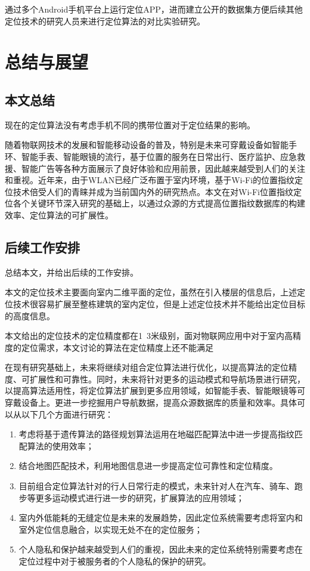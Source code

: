 通过多个Android手机平台上运行定位APP，进而建立公开的数据集方便后续其他定位技术的研究人员来进行定位算法的对比实验研究。




\chapter{总结与展望}

\section{本文总结}

现在的定位算法没有考虑手机不同的携带位置对于定位结果的影响。

随着物联网技术的发展和智能移动设备的普及，特别是未来可穿戴设备如智能手环、智能手表、智能眼镜的流行，基于位置的服务在日常出行、医疗监护、应急救援、智能广告等各种方面展示了良好体验和应用前景，因此越来越受到人们的关注和重视。近年来，由于WLAN已经广泛布置于室内环境，基于Wi-Fi的位置指纹定位技术倍受人们的青睐并成为当前国内外的研究热点。本文在对Wi-Fi位置指纹定位各个关键环节深入研究的基础上，以通过众源的方式提高位置指纹数据库的构建效率、定位算法的可扩展性。

\section{后续工作安排}

总结本文，并给出后续的工作安排。

本文的定位技术主要面向室内二维平面的定位，虽然在引入楼层的信息后，上述定位技术很容易扩展至整栋建筑的室内定位，但是上述定位技术并不能给出定位目标的高度信息。

本文给出的定位技术的定位精度都在1~3米级别，面对物联网应用中对于室内高精度的定位需求，本文讨论的算法在定位精度上还不能满足

在现有研究基础上，未来将继续对组合定位算法进行优化，以提高算法的定位精度、可扩展性和可靠性。同时，未来将针对更多的运动模式和导航场景进行研究，以提高算法适用性，将定位算法扩展到更多应用领域，如智能手表、智能眼镜等可穿戴设备上。更进一步挖掘用户导航数据，提高众源数据库的质量和效率。具体可以从以下几个方面进行研究：

\begin{enumerate}
	\item 考虑将基于遗传算法的路径规划算法运用在地磁匹配算法中进一步提高指纹匹配算法的使用效率；
	\item 结合地图匹配技术，利用地图信息进一步提高定位可靠性和定位精度。
	\item 目前组合定位算法针对的行人日常行走的模式，未来针对人在汽车、骑车、跑步等更多运动模式进行进一步的研究，扩展算法的应用领域；
	\item 室内外低能耗的无缝定位是未来的发展趋势，因此定位系统需要考虑将室内和室外定位信息融合，以实现无处不在的定位服务；
	\item 个人隐私和保护越来越受到人们的重视，因此未来的定位系统特别需要考虑在定位过程中对于被服务者的个人隐私的保护的研究。
\end{enumerate}

